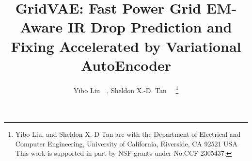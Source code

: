 \documentclass[journal]{IEEEtran}
\begin{document}
\title{GridVAE: Fast Power Grid EM-Aware IR Drop Prediction and Fixing
  Accelerated by Variational AutoEncoder}


\author{
Yibo Liu~~, Sheldon X.-D. Tan~
~\thanks{
 \indent  Yibo Liu, and Sheldon X.-D Tan are with the Department of
 Electrical and Computer Engineering,  University of California,
 Riverside, CA 92521 USA
  \newline \indent
This work is supported in part by NSF grants under
No.CCF-2305437.
}
}

\maketitle
  
\begin{abstract}



\end{abstract}
\end{document}
